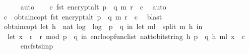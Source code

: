 \begin{isabellebody}
\ \ \ \ \isamarkupfalse%
\ auto\isanewline
\isanewline
\ \ \isamarkupfalse%
\ {\isachardoublequoteopen}{\isasymexists}c{\isachardot}{\kern0pt}\ fst\ {\isacharparenleft}{\kern0pt}encrypt{\isacharunderscore}{\kern0pt}alt\ {\isacharparenleft}{\kern0pt}p\ {\isacharasterisk}{\kern0pt}\ q{\isacharparenright}{\kern0pt}\ m\ r{\isacharparenright}{\kern0pt}\ {\isacharequal}{\kern0pt}\ c{\isachardoublequoteclose}\ \isamarkupfalse%
\ auto\isanewline
\ \ \isamarkupfalse%
\ \isamarkupfalse%
\ c\ \ obtain{\isacharunderscore}{\kern0pt}c{\isacharunderscore}{\kern0pt}opt{}{\isacharcolon}{\kern0pt}\ {\isachardoublequoteopen}fst\ {\isacharparenleft}{\kern0pt}encrypt{\isacharunderscore}{\kern0pt}alt\ {\isacharparenleft}{\kern0pt}p\ {\isacharasterisk}{\kern0pt}\ q{\isacharparenright}{\kern0pt}\ m\ r{\isacharparenright}{\kern0pt}\ {\isacharequal}{\kern0pt}\ c{\isachardoublequoteclose}\ \isamarkupfalse%
\ blast\isanewline
\ \ \isamarkupfalse%
\ \isamarkupfalse%
\ obtain{\isacharunderscore}{\kern0pt}c{\isacharunderscore}{\kern0pt}opt{}{\isacharcolon}{\kern0pt}\ {\isachardoublequoteopen}{\isacharparenleft}{\kern0pt}let\ h\ {\isacharequal}{\kern0pt}\ nat\ {\isasymlfloor}log\ {}\ {\isacharparenleft}{\kern0pt}log\ {}\ {\isacharparenleft}{\kern0pt}p\ {\isacharasterisk}{\kern0pt}\ q{\isacharparenright}{\kern0pt}{\isacharparenright}{\kern0pt}{\isasymrfloor}\ in\ let\ m{\isacharunderscore}{\kern0pt}l\ {\isacharequal}{\kern0pt}\ split\ m\ h\ in\ \isanewline
\ \ let\ x{\isacharunderscore}{\kern0pt}{}\ {\isacharequal}{\kern0pt}\ {\isacharparenleft}{\kern0pt}r\ {\isacharasterisk}{\kern0pt}\ r{\isacharparenright}{\kern0pt}\ mod\ {\isacharparenleft}{\kern0pt}p\ {\isacharasterisk}{\kern0pt}\ q{\isacharparenright}{\kern0pt}\ in\ enc{\isacharunderscore}{\kern0pt}loop{\isacharunderscore}{\kern0pt}func{\isacharunderscore}{\kern0pt}list\ {\isacharparenleft}{\kern0pt}nat{\isacharunderscore}{\kern0pt}to{\isacharunderscore}{\kern0pt}bitstring\ h{\isacharcomma}{\kern0pt}\ p\ {\isacharasterisk}{\kern0pt}\ q{\isacharcomma}{\kern0pt}\ h{\isacharcomma}{\kern0pt}\ m{\isacharunderscore}{\kern0pt}l{\isacharparenright}{\kern0pt}\ x{\isacharunderscore}{\kern0pt}{}{\isacharparenright}{\kern0pt}\ {\isacharequal}{\kern0pt}\ c{\isachardoublequoteclose}\isanewline
\ \ \ \ \isamarkupfalse%
\ enc{\isacharunderscore}{\kern0pt}fst{\isacharunderscore}{\kern0pt}simp\ \isamarkupfalse%

\end{isabellebody}
